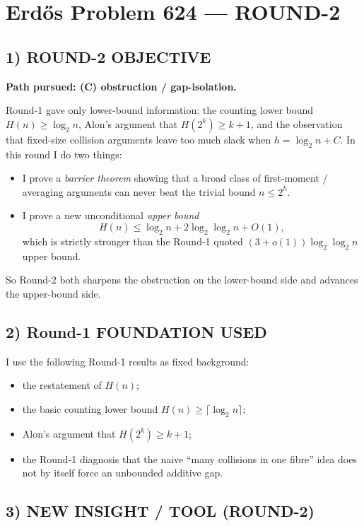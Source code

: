 \section{Erd\H{o}s Problem 624 --- ROUND-2}

\subsection*{1) ROUND-2 OBJECTIVE}

\textbf{Path pursued: (C) obstruction / gap-isolation.}

Round-1 gave only lower-bound information:
the counting lower bound $H(n)\ge \log_2 n$, Alon's argument that $H(2^k)\ge k+1$,
and the observation that fixed-size collision arguments leave too much slack when
$h=\log_2 n + C$.
In this round I do two things:

\begin{itemize}
\item I prove a \emph{barrier theorem} showing that a broad class of first-moment / averaging arguments
can never beat the trivial bound $n\le 2^h$.
\item I prove a new unconditional \emph{upper bound}
\[
H(n)\le \log_2 n + 2\log_2\log_2 n + O(1),
\]
which is strictly stronger than the Round-1 quoted $(3+o(1))\log_2\log_2 n$ upper bound.
\end{itemize}

So Round-2 both sharpens the obstruction on the lower-bound side and advances the upper-bound side.

\subsection*{2) Round-1 FOUNDATION USED}

I use the following Round-1 results as fixed background:

\begin{itemize}
\item the restatement of $H(n)$;
\item the basic counting lower bound $H(n)\ge \lceil\log_2 n\rceil$;
\item Alon's argument that $H(2^k)\ge k+1$;
\item the Round-1 diagnosis that the naive ``many collisions in one fibre'' idea does not by itself force
an unbounded additive gap.
\end{itemize}

\subsection*{3) NEW INSIGHT / TOOL (ROUND-2)}

